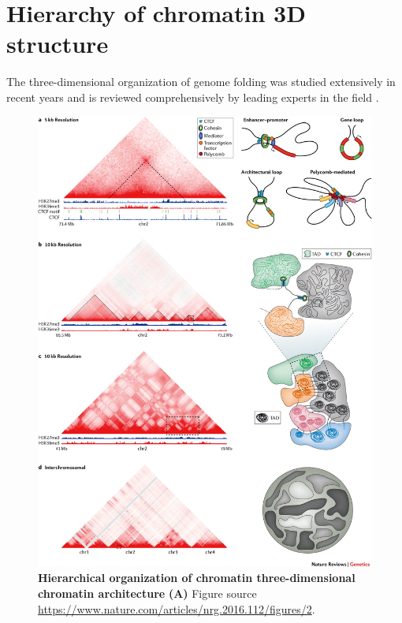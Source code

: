 \documentclass[a4paper,twoside=true,openright,parskip=full,chapterprefix=true,11pt,headings=normal,bibliography=totoc,listof=totoc,titlepage=on,captions=tableabove,draft=false]{scrreprt}
\theoremstyle{definition}
\theoremstyle{definition}
\theoremstyle{definition}
\theoremstyle{remark}
\begin{document}
\hypertarget{hierarchy-of-chromatin-3d-structure}{%
\section{Hierarchy of chromatin 3D
structure}\label{hierarchy-of-chromatin-3d-structure}}

The three-dimensional organization of genome folding was studied
extensively in recent years and is reviewed comprehensively by leading
experts in the field
\citep{Pombo2015, Sexton2015, Bouwman2015, Dekker2016, Dixon2016, Schmitt2016, Bonev2016, Hnisz2016a, Merkenschlager2016, Long2016, Rowley2016, Ruiz-Velasco2017, Andrey2017}.

\begin{figure}

{\centering \includegraphics[width=1\linewidth]{figures/Bonev2016Fig2} 

}

\caption{\textbf{Hierarchical organization of chromatin
three-dimensional chromatin architecture} \textbf{(A)} Figure source
\citep{Bonev2016}
\url{https://www.nature.com/articles/nrg.2016.112/figures/2}.}\label{fig:GenomeHierarchy}
\end{figure}
\end{document}
